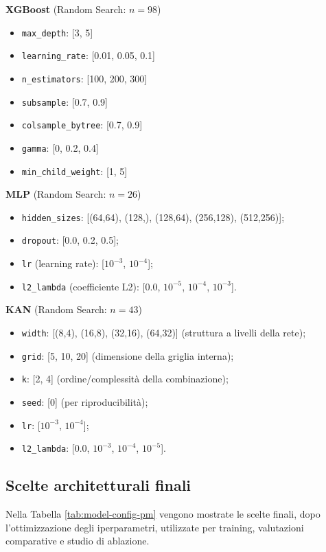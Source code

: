 \documentclass[a4paper,12pt]{report}
\begin{document}
	\smallskip
	\noindent\textbf{XGBoost} \quad (Random Search: $n=98$)
	\begin{itemize}
		\item \texttt{max\_depth}: [3, 5]
		\item \texttt{learning\_rate}: [0.01, 0.05, 0.1]
		\item \texttt{n\_estimators}: [100, 200, 300]
		\item \texttt{subsample}: [0.7, 0.9]
		\item \texttt{colsample\_bytree}: [0.7, 0.9]
		\item \texttt{gamma}: [0, 0.2, 0.4]
		\item \texttt{min\_child\_weight}: [1, 5]
	\end{itemize}
	
	\smallskip
	\noindent\textbf{MLP} \quad (Random Search: $n=26$)
	\begin{itemize}
		\item \texttt{hidden\_sizes}: [(64,64), (128,), (128,64), (256,128), (512,256)];
		\item \texttt{dropout}: [0.0, 0.2, 0.5];
		\item \texttt{lr} (learning rate): [$10^{-3}$, $10^{-4}$];
		\item \texttt{l2\_lambda} (coefficiente L2): [0.0, $10^{-5}$, $10^{-4}$, $10^{-3}$].
	\end{itemize}
	
	\smallskip
	\noindent\textbf{KAN} \quad (Random Search: $n=43$)
	\begin{itemize}
		\item \texttt{width}: [(8,4), (16,8), (32,16), (64,32)] (struttura a livelli della rete);
		\item \texttt{grid}: [5, 10, 20] (dimensione della griglia interna);
		\item \texttt{k}: [2, 4] (ordine/complessit\`a della combinazione);
		\item \texttt{seed}: [0] (per riproducibilit\`a);
		\item \texttt{lr}: [$10^{-3}$, $10^{-4}$];
		\item \texttt{l2\_lambda}: [0.0, $10^{-3}$, $10^{-4}$, $10^{-5}$].
	\end{itemize}
	
	\subsection{Scelte architetturali finali}
	Nella Tabella \ref{tab:model-config-pm} vengono mostrate le scelte finali, dopo l'ottimizzazione degli iperparametri, utilizzate per training, valutazioni comparative e studio di ablazione.
	
\end{document}
